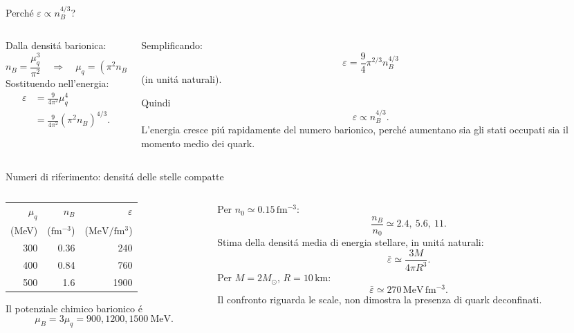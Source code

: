 \begin{frame}[t]{Perch\'e $\varepsilon\propto n_B^{4/3}$?}
\small
\begin{columns}[T,onlytextwidth]
\begin{column}{0.49\textwidth}
Dalla densit\'a barionica:
\[
n_B=\frac{\mu_q^3}{\pi^2}
\quad\Rightarrow\quad
\mu_q=(\pi^2n_B)^{1/3}.
\]
Sostituendo nell'energia:
\[
\begin{aligned}
\varepsilon
&=\frac{9}{4\pi^2}\mu_q^4\\
&=\frac{9}{4\pi^2}(\pi^2n_B)^{4/3}.
\end{aligned}
\]
\end{column}
\begin{column}{0.49\textwidth}
Semplificando:
\[
\boxed{\varepsilon=\frac94\pi^{2/3}n_B^{4/3}}
\]
(in unit\'a naturali).

Quindi
\[
\boxed{\varepsilon\propto n_B^{4/3}}.
\]
L'energia cresce pi\'u rapidamente del numero barionico, perch\'e aumentano sia gli stati occupati sia il momento medio dei quark.
\end{column}
\end{columns}
\end{frame}

\begin{frame}[t]{Numeri di riferimento: densit\'a delle stelle compatte}
\small
\begin{columns}[T,onlytextwidth]
\begin{column}{0.49\textwidth}
\centering
\begin{tabular}{r|r|r}
$\mu_q$ & $n_B$ & $\varepsilon$ \\
(MeV) & ($\mathrm{fm^{-3}}$) & ($\mathrm{MeV/fm^3}$)\\ \hline
300 & 0.36 & 240 \\
400 & 0.84 & 760 \\
500 & 1.6 & 1900
\end{tabular}
\par\medskip
Il potenziale chimico barionico \'e
\[
\mu_B=3\mu_q
=900,1200,1500\ \mathrm{MeV}.
\]
\end{column}
\begin{column}{0.49\textwidth}
Per $n_0\simeq0.15\,\mathrm{fm^{-3}}$:
\[
\frac{n_B}{n_0}\simeq2.4,\ 5.6,\ 11.
\]
Stima della densit\'a media di energia stellare, in unit\'a naturali:
\[
\bar\varepsilon\simeq\frac{3M}{4\pi R^3}.
\]
Per $M=2M_\odot$, $R=10\,\mathrm{km}$:
\[
\bar\varepsilon\simeq270\,\mathrm{MeV\,fm^{-3}}.
\]
Il confronto riguarda le scale, non dimostra la presenza di quark deconfinati.
\end{column}
\end{columns}
\end{frame}

